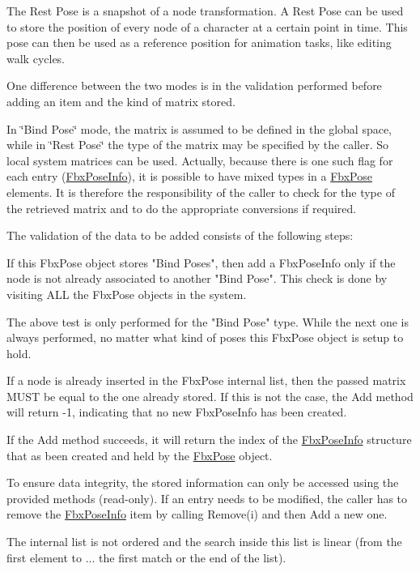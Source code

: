 The Rest Pose is a snapshot of a node transformation. A Rest Pose can be used to store the position of every node of a character at a certain point in time. This pose can then be used as a reference position for animation tasks, like editing walk cycles.

One difference between the two modes is in the validation performed before adding an item and the kind of matrix stored.

In \char`\"{}\+Bind Pose\char`\"{} mode, the matrix is assumed to be defined in the global space, while in \char`\"{}\+Rest Pose\char`\"{} the type of the matrix may be specified by the caller. So local system matrices can be used. Actually, because there is one such flag for each entry (\hyperlink{struct_fbx_pose_info}{Fbx\+Pose\+Info}), it is possible to have mixed types in a \hyperlink{class_fbx_pose}{Fbx\+Pose} elements. It is therefore the responsibility of the caller to check for the type of the retrieved matrix and to do the appropriate conversions if required.

The validation of the data to be added consists of the following steps\+: \begin{DoxyVerb}\li If this FbxPose object stores "Bind Poses", then
   add a FbxPoseInfo only if the node is not already
   associated to another "Bind Pose". This check is done
   by visiting ALL the FbxPose objects in the system.

   The above test is only performed for the "Bind Pose" type. While
   the next one is always performed, no matter what kind of poses this
   FbxPose object is setup to hold.

\li If a node is already inserted in the FbxPose internal list,
   then the passed matrix MUST be equal to the one already stored.
   If this is not the case, the Add method will return -1, indicating
   that no new FbxPoseInfo has been created.
\end{DoxyVerb}


If the Add method succeeds, it will return the index of the \hyperlink{struct_fbx_pose_info}{Fbx\+Pose\+Info} structure that as been created and held by the \hyperlink{class_fbx_pose}{Fbx\+Pose} object.

To ensure data integrity, the stored information can only be accessed using the provided methods (read-\/only). If an entry needs to be modified, the caller has to remove the \hyperlink{struct_fbx_pose_info}{Fbx\+Pose\+Info} item by calling Remove(i) and then Add a new one.

The internal list is not ordered and the search inside this list is linear (from the first element to ... the first match or the end of the list). 

